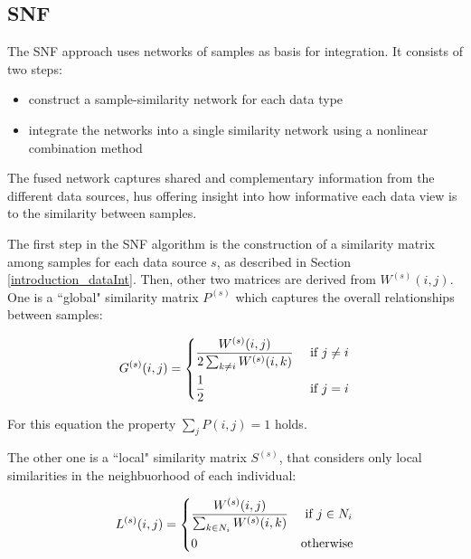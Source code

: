 \subsection{SNF} \label{dataInt_SNF}
The SNF\cite{wang2014similarity} approach uses networks of samples as basis for integration. It consists of two steps:
\begin{itemize}
    \item construct a sample-similarity network for each data type
    \item integrate the networks into a single similarity network using a nonlinear combination method
\end{itemize}
The fused network captures shared and complementary information from the different data sources, hus offering insight into how informative each data view is to the similarity between samples.

The first step in the SNF algorithm is the construction of a similarity matrix among samples for each data source $s$, as described in Section \ref{introduction_dataInt}. Then, other two matrices are derived from $W^{(s)}(i,j)$. One is a ``global" similarity matrix $P^{(s)}$ which captures the overall relationships between samples:

\begin{equation}\label{eq:global_kernel}
    G^{(s)}(i,j) = 
    \begin{dcases}
        \frac{W^{(s)}(i,j)}{2 \sum_{k \neq i} W^{(s)}(i,k)} & \text{ if $j \neq i$}\\
        \frac{1}{2} & \text{ if $j = i$}\\
    \end{dcases}       
\end{equation}


For this equation the property $\sum_{j} P(i,j)=1$ holds.

The other one is a ``local" similarity matrix $S^{(s)}$, that considers only local similarities in the neighbuorhood of each individual:

\begin{equation}
\label{eq:local_kernel}
    L^{(s)}(i,j) = 
    \begin{dcases}
      \frac{W^{(s)}(i,j)}{\sum_{k \in N_i} W^{(s)}(i,k)} & \text{ if $j \in N_i$}\\
      0 & \text{otherwise}\\
    \end{dcases}       
\end{equation}

